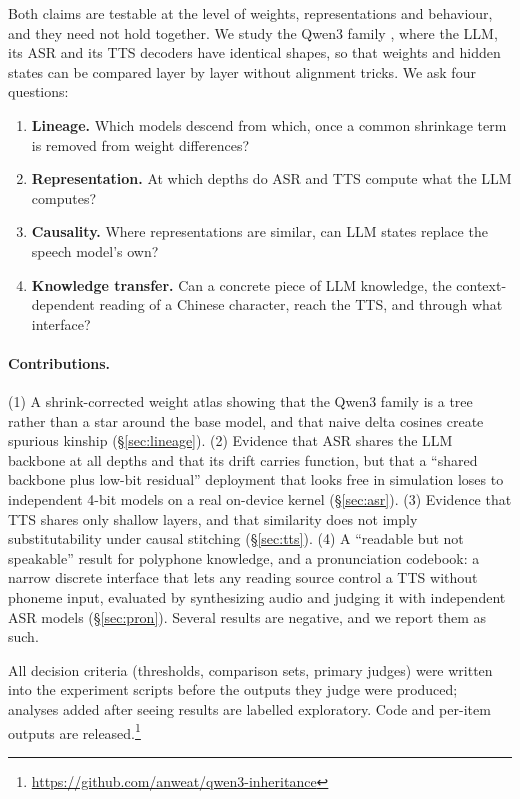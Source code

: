 \documentclass[11pt]{article}
\begin{document}
Both claims are testable at the level of weights, representations and behaviour, and they need not hold together. We study the Qwen3 family \citep{qwen3}, where the LLM, its ASR \citep{qwen3asr} and its TTS \citep{qwen3tts} decoders have identical shapes, so that weights and hidden states can be compared layer by layer without alignment tricks. We ask four questions:
\begin{enumerate}
  \item \textbf{Lineage.} Which models descend from which, once a common shrinkage term is removed from weight differences?
  \item \textbf{Representation.} At which depths do ASR and TTS compute what the LLM computes?
  \item \textbf{Causality.} Where representations are similar, can LLM states replace the speech model's own?
  \item \textbf{Knowledge transfer.} Can a concrete piece of LLM knowledge, the context-dependent reading of a Chinese character, reach the TTS, and through what interface?
\end{enumerate}

\paragraph{Contributions.}
(1) A shrink-corrected weight atlas showing that the Qwen3 family is a tree rather than a star around the base model, and that naive delta cosines create spurious kinship (\S\ref{sec:lineage}).
(2) Evidence that ASR shares the LLM backbone at all depths and that its drift carries function, but that a ``shared backbone plus low-bit residual'' deployment that looks free in simulation loses to independent 4-bit models on a real on-device kernel (\S\ref{sec:asr}).
(3) Evidence that TTS shares only shallow layers, and that similarity does not imply substitutability under causal stitching (\S\ref{sec:tts}).
(4) A ``readable but not speakable'' result for polyphone knowledge, and a pronunciation codebook: a narrow discrete interface that lets any reading source control a TTS without phoneme input, evaluated by synthesizing audio and judging it with independent ASR models (\S\ref{sec:pron}).
Several results are negative, and we report them as such.

All decision criteria (thresholds, comparison sets, primary judges) were written into the experiment scripts before the outputs they judge were produced; analyses added after seeing results are labelled exploratory. Code and per-item outputs are released.\footnote{\url{https://github.com/anweat/qwen3-inheritance}}
\end{document}
